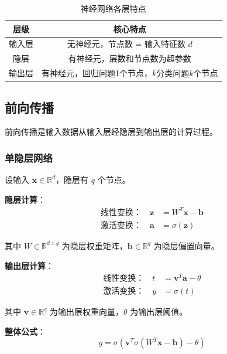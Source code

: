 \documentclass[12pt,a4paper]{ctexart}
\begin{document}
\begin{table}[H]
\centering
\caption{神经网络各层特点}
\begin{tabular}{cc}
\toprule
\textbf{层级} & \textbf{核心特点} \\
\midrule
输入层 & 无神经元，节点数 = 输入特征数 $d$ \\
隐层 & 有神经元，层数和节点数为超参数 \\
输出层 & 有神经元，回归问题1个节点，$k$分类问题$k$个节点 \\
\bottomrule
\end{tabular}
\end{table}

\subsection{前向传播}

前向传播是输入数据从输入层经隐层到输出层的计算过程。

\subsubsection{单隐层网络}

设输入 $\mathbf{x} \in \mathbb{R}^d$，隐层有 $q$ 个节点。

\textbf{隐层计算}：
\begin{align}
\text{线性变换：} \quad \mathbf{z} &= W^T\mathbf{x} - \mathbf{b} \\
\text{激活变换：} \quad \mathbf{a} &= \sigma(\mathbf{z})
\end{align}

其中 $W \in \mathbb{R}^{d \times q}$ 为隐层权重矩阵，$\mathbf{b} \in \mathbb{R}^q$ 为隐层偏置向量。

\textbf{输出层计算}：
\begin{align}
\text{线性变换：} \quad t &= \mathbf{v}^T\mathbf{a} - \theta \\
\text{激活变换：} \quad y &= \sigma(t)
\end{align}

其中 $\mathbf{v} \in \mathbb{R}^q$ 为输出层权重向量，$\theta$ 为输出层阈值。

\textbf{整体公式}：
\[
y = \sigma\left(\mathbf{v}^T\sigma\left(W^T\mathbf{x} - \mathbf{b}\right) - \theta\right)
\]
\end{document}
